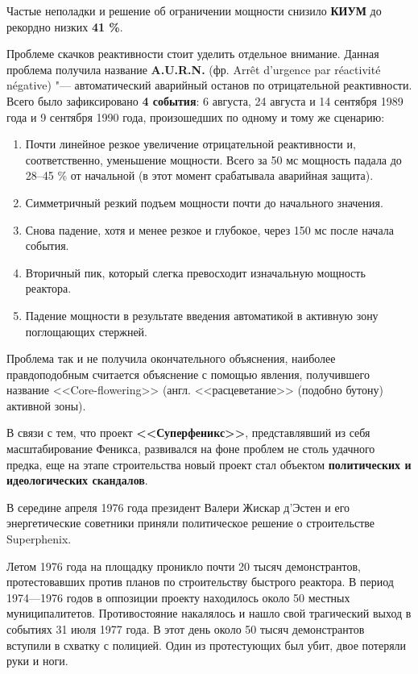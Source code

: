 Частые неполадки и решение об ограничении мощности снизило \textbf{КИУМ} до рекордно низких \textbf{41 \%}.

Проблеме скачков реактивности стоит уделить отдельное внимание. Данная проблема получила название \textbf{A.U.R.N.} (фр. Arrêt d’urgence par réactivité négative) "--- автоматический аварийный останов по отрицательной реактивности. Всего было зафиксировано \textbf{4 события}: 6 августа, 24 августа и 14 сентября 1989 года и 9 сентября 1990 года, произошедших по одному и тому же сценарию:
\begin{enumerate}
	\item Почти линейное резкое увеличение отрицательной реактивности и, соответственно, уменьшение мощности. Всего за 50 мс мощность падала до 28--45 \% от начальной (в этот момент срабатывала аварийная защита).
	
	\item Симметричный резкий подъем мощности почти до начального значения.
	
	\item Снова падение, хотя и менее резкое и глубокое, через 150 мс после начала события.
	
	\item Вторичный пик, который слегка превосходит изначальную мощность реактора.
	
	\item Падение мощности в результате введения автоматикой в активную зону поглощающих стержней.
\end{enumerate}

Проблема так и не получила окончательного объяснения, наиболее правдоподобным считается объяснение с помощью явления, получившего название <<Core-flowering>> (англ. <<расцеветание>> (подобно бутону) активной зоны).

В связи с тем, что проект \textbf{<<Суперфеникс>>}, представлявший из себя масштабирование Феникса, развивался на фоне проблем не столь удачного предка, еще на этапе строительства новый проект стал объектом \textbf{политических и идеологических скандалов}.

В середине апреля 1976 года президент Валери Жискар д’Эстен и его энергетические советники приняли политическое решение о строительстве Superphenix.

Летом 1976 года на площадку проникло почти 20 тысяч демонстрантов, протестовавших против планов по строительству быстрого реактора. В период 1974—1976 годов в оппозиции проекту находилось около 50 местных муниципалитетов. Противостояние накалялось и нашло свой трагический выход в событиях 31 июля 1977 года. В этот день около 50 тысяч демонстрантов вступили в схватку с полицией. Один из протестующих был убит, двое потеряли руки и ноги.

